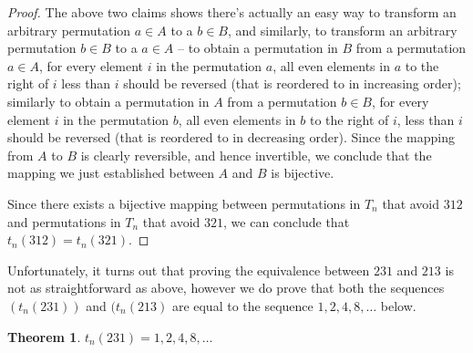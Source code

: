 \documentclass[11pt,letterpaper,twoside,english]{article}
\theoremstyle{theorem}
\newtheorem{theorem}{Theorem}
\theoremstyle{remark}
\begin{document}
\begin{proof}
The above two claims shows there's actually an easy way to transform an arbitrary permutation $a \in A$ to a $b \in B$, and similarly, to transform an arbitrary permutation $b \in B$ to a $a \in A$ -- to obtain a permutation in $B$ from a permutation $a \in A$, for every element $i$ in the permutation $a$, all even elements in $a$ to the right of $i$ less than $i$ should be reversed (that is reordered to in increasing order); similarly to obtain a permutation in $A$ from a permutation $b \in B$, for every element $i$ in the permutation $b$, all even elements in $b$ to the right of $i$, less than $i$ should be reversed (that is reordered to in decreasing order). Since the mapping from $A$ to $B$ is clearly reversible, and hence invertible, we conclude that the mapping we just established between $A$ and $B$ is bijective.

Since there exists a bijective mapping between permutations in $T_n$ that avoid $312$ and permutations in $T_n$ that avoid $321$, we can conclude that $t_n(312) = t_n(321)$.

\end{proof}

Unfortunately, it turns out that proving the equivalence between $231$ and $213$ is not as straightforward as above, however we do prove that both the sequences $(t_n(231))$ and $(t_n(213)$ are equal to the sequence $1, 2, 4, 8, \ldots$ below.

\begin{theorem}
$t_n(231) = 1, 2, 4, 8, \ldots$
\end{theorem}
\end{document}
